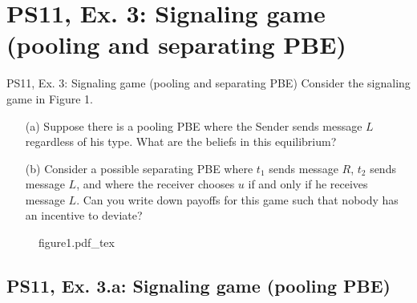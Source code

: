 \section{PS11, Ex. 3: Signaling game (pooling and separating PBE)}

\begin{frame}{PS11, Ex. 3: Signaling game (pooling and separating PBE)}
    Consider the signaling game in Figure 1.
    \begin{itemize}
      \item[(a)] Suppose there is a pooling PBE where the Sender sends message $L$ regardless of his type. What are the beliefs in this equilibrium?
      \item[(b)] Consider a possible separating PBE where $t_1$ sends message $R$, $t_2$ sends message $L$, and where the receiver chooses $u$ if and only if he receives message $L$. Can you write down payoffs for this game such that nobody has an incentive to deviate?
    \end{itemize} \vspace{-8pt}
    \begin{multicols}{2}
      \vfill\null\columnbreak
      \begin{figure}[!h]
        \center\def\svgwidth{\columnwidth}
        {figure1.pdf_tex}
      \end{figure}
      \vfill\null \columnbreak
      \vfill
    \end{multicols}
\end{frame}


\subsection{PS11, Ex. 3.a: Signaling game (pooling PBE)}

